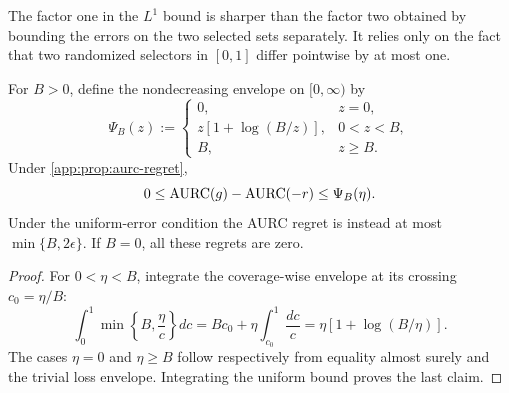 The factor one in the $L^1$ bound is sharper than the factor two obtained by
bounding the errors on the two selected sets separately. It relies only on the
fact that two randomized selectors in $[0,1]$ differ pointwise by at most one.

\begin{corollary}
\label{app:cor:aurc-regret}
For $B>0$, define the nondecreasing envelope on $[0,\infty)$ by
\begin{equation*}
  \Psi_B(z):=
  \begin{cases}
    0,&z=0,\\
    z[1+\log(B/z)],&0<z<B,\\
    B,&z\geq B.
  \end{cases}
\end{equation*}
Under \cref{app:prop:aurc-regret},
\begin{equation*}
  0\leq\operatorname{AURC}(g)-\operatorname{AURC}(-r)\leq\Psi_B(\eta).
\end{equation*}
Under the uniform-error condition the AURC regret is instead at most
$\min\{B,2\epsilon\}$. If $B=0$, all these regrets are zero.
\end{corollary}

\begin{proof}
For $0<\eta<B$, integrate the coverage-wise envelope at its crossing
$c_0=\eta/B$:
\begin{equation*}
  \int_0^1\min\!\left\{B,\frac{\eta}{c}\right\}dc
  =Bc_0+\eta\int_{c_0}^1\frac{dc}{c}
  =\eta[1+\log(B/\eta)].
\end{equation*}
The cases $\eta=0$ and $\eta\geq B$ follow respectively from equality almost
surely and the trivial loss envelope. Integrating the uniform bound proves the
last claim.
\end{proof}

